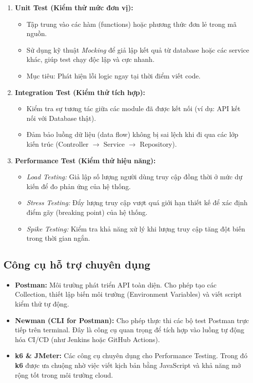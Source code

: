\documentclass[12pt, a4paper]{article}
\begin{document}
\begin{enumerate}[leftmargin=*]
    \item \textbf{Unit Test (Kiểm thử mức đơn vị):} 
    \begin{itemize}
        \item Tập trung vào các hàm (functions) hoặc phương thức đơn lẻ trong mã nguồn.
        \item Sử dụng kỹ thuật \textit{Mocking} để giả lập kết quả từ database hoặc các service khác, giúp test chạy độc lập và cực nhanh.
        \item Mục tiêu: Phát hiện lỗi logic ngay tại thời điểm viết code.
    \end{itemize}

    \item \textbf{Integration Test (Kiểm thử tích hợp):} 
    \begin{itemize}
        \item Kiểm tra sự tương tác giữa các module đã được kết nối (ví dụ: API kết nối với Database thật).
        \item Đảm bảo luồng dữ liệu (data flow) không bị sai lệch khi đi qua các lớp kiến trúc (Controller $\rightarrow$ Service $\rightarrow$ Repository).
    \end{itemize}

    \item \textbf{Performance Test (Kiểm thử hiệu năng):} 
    \begin{itemize}
        \item \textit{Load Testing:} Giả lập số lượng người dùng truy cập đồng thời ở mức dự kiến để đo phản ứng của hệ thống.
        \item \textit{Stress Testing:} Đẩy lượng truy cập vượt quá giới hạn thiết kế để xác định điểm gãy (breaking point) của hệ thống.
        \item \textit{Spike Testing:} Kiểm tra khả năng xử lý khi lượng truy cập tăng đột biến trong thời gian ngắn.
    \end{itemize}
\end{enumerate}

\subsection{Công cụ hỗ trợ chuyên dụng}
\begin{itemize}
    \item \textbf{Postman:} Môi trường phát triển API toàn diện. Cho phép tạo các Collection, thiết lập biến môi trường (Environment Variables) và viết script kiểm thử tự động.
    \item \textbf{Newman (CLI for Postman):} Cho phép thực thi các bộ test Postman trực tiếp trên terminal. Đây là công cụ quan trọng để tích hợp vào luồng tự động hóa CI/CD (như Jenkins hoặc GitHub Actions).
    \item \textbf{k6 \& JMeter:} Các công cụ chuyên dụng cho Performance Testing. Trong đó \textbf{k6} được ưa chuộng nhờ việc viết kịch bản bằng JavaScript và khả năng mở rộng tốt trong môi trường cloud.
\end{itemize}
\end{document}
